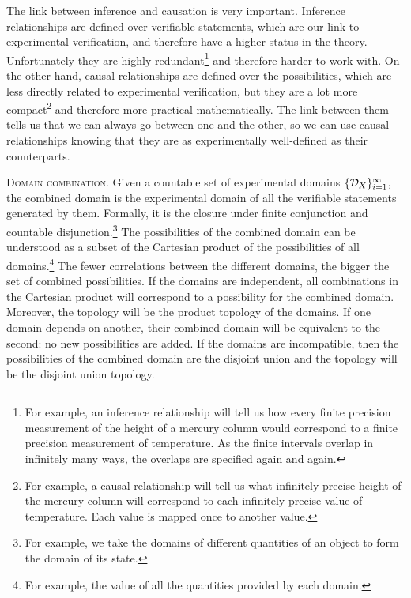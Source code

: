 \documentclass[10pt,twocolumn, nofootinbib]{revtex4-2}
\newcommand\partitle[1]{\textsc{#1}.}
\begin{document}
The link between inference and causation is very important. Inference relationships are defined over verifiable statements, which are our link to experimental verification, and therefore have a higher status in the theory. Unfortunately they are highly redundant\footnote{For example, an inference relationship will tell us how every finite precision measurement of the height of a mercury column would correspond to a finite precision measurement of temperature. As the finite intervals overlap in infinitely many ways, the overlaps are specified again and again.} and therefore harder to work with. On the other hand, causal relationships are defined over the possibilities, which are less directly related to experimental verification, but they are a lot more compact\footnote{For example, a causal relationship will tell us what infinitely precise height of the mercury column will correspond to each infinitely precise value of temperature. Each value is mapped once to another value.} and therefore more practical mathematically. The link between them tells us that we can always go between one and the other, so we can use causal relationships knowing that they are as experimentally well-defined as their counterparts.

\partitle{Domain combination} Given a countable set of experimental domains $\{\mathcal{D}_X\}_{i=1}^{\infty}$, the combined domain is the experimental domain of all the verifiable statements generated by them. Formally, it is the closure under finite conjunction and countable disjunction.\footnote{For example, we take the domains of different quantities of an object to form the domain of its state.} The possibilities of the combined domain can be understood as a subset of the Cartesian product of the possibilities of all domains.\footnote{For example, the value of all the quantities provided by each domain.} The fewer correlations between the different domains, the bigger the set of combined possibilities. If the domains are independent, all combinations in the Cartesian product will correspond to a possibility for the combined domain. Moreover, the topology will be the product topology of the domains. If one domain depends on another, their combined domain will be equivalent to the second: no new possibilities are added. If the domains are incompatible, then the possibilities of the combined domain are the disjoint union and the topology will be the disjoint union topology.
\end{document}
